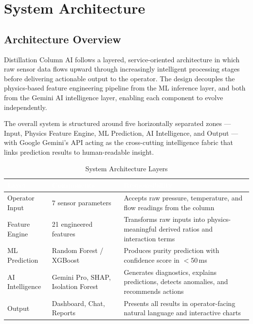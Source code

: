 \documentclass[12pt,a4paper]{report}
\newcommand{\thead}[1]{%
  \cellcolor{tabheader}\textcolor{white}{\textbf{#1}}%
}
\begin{document}
\chapter{System Architecture}

\section{Architecture Overview}

Distillation Column AI follows a layered, service-oriented architecture in which raw
sensor data flows upward through increasingly intelligent processing stages before
delivering actionable output to the operator. The design decouples the physics-based
feature engineering pipeline from the ML inference layer, and both from the Gemini
AI intelligence layer, enabling each component to evolve independently.

The overall system is structured around five horizontally separated zones — Input,
Physics Feature Engine, ML Prediction, AI Intelligence, and Output — with Google
Gemini's API acting as the cross-cutting intelligence fabric that links prediction
results to human-readable insight.

\begin{table}[H]
\centering
\caption{System Architecture Layers}
\label{tab:archlayers}
\renewcommand{\arraystretch}{1.35}
\begin{tabularx}{\textwidth}{|L{3.2cm}|L{4cm}|L{7cm}|}
\hline
\thead{Layer} & \thead{Components} & \thead{Responsibility} \\
\hline
Operator Input  & 7 sensor parameters                 & Accepts raw pressure, temperature, and flow readings from the column \\
Feature Engine  & 21 engineered features              & Transforms raw inputs into physics-meaningful derived ratios and interaction terms \\
ML Prediction   & Random Forest / XGBoost             & Produces purity prediction with confidence score in $<$50\,ms \\
AI Intelligence & Gemini Pro, SHAP, Isolation Forest  & Generates diagnostics, explains predictions, detects anomalies, and recommends actions \\
Output          & Dashboard, Chat, Reports            & Presents all results in operator-facing natural language and interactive charts \\
\hline
\end{tabularx}
\end{table}
\end{document}
